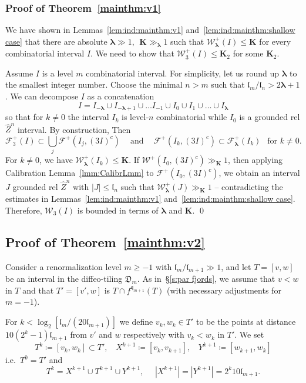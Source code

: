\documentclass{amsart}
\renewcommand{\sp}{{\ \ }}
\newcommand{\1}{{\mathbb 1 }}
\newcommand{\blambda}{{\boldsymbol\lambda}}
\newcommand{\Fam}{{\mathcal F}}
\newcommand{\Width}{{\mathcal W}}
\newcommand{\wZ}{{\widehat Z}}
\newcommand{\bK}{{\mathbf K}}
\newcommand{\qq}{\mathfrak{q}}
\newcommand{\length}{{\mathfrak l}}
\newcommand{\Dbb}{{\mathfrak{D}}}
\theoremstyle{remark}
\numberwithin{equation}{section}
\theoremstyle{definition}
\begin{document}
\subsubsection{Proof of Theorem~\ref{mainthm:v1}} \label{sss:PrfOf mainthm:v1} We have shown in Lemmas~\ref{lem:ind:mainthm:v1} and~\ref{lem:ind:mainthm:shallow case} that there are absolute $\blambda \gg 1,\sp \bK\gg_\blambda 1$ such that $\Width^+_\blambda(I) \le \bK$ for every combinatorial interval $I$. We need to show that $\Width^+_3(I)\le  \bK_2$ for some $\bK_2$.

Assume $I$ is a level $m$ combinatorial interval. For simplicity, let us round up $\blambda$ to the smallest integer number. Choose the minimal $n>m$ such that $\length_{m}/\length_n>2\blambda+1$. We can decompose $I$ as a concatenation \[I=I_{-\blambda}\cup I_{-\blambda+1}\cup \dots I_{-1}\cup I_0\cup I_1\cup \dots \cup I_{\blambda}\]
so that for $k\not=0$ the interval $I_k$ is level-$n$ combinatorial while $I_0$ is a grounded rel $\wZ^{n}$ interval. By construction,
Then \[\Fam^+_{3} (I)\subset \bigcup_{j}\Fam^+(I_j, (3I)^c)\sp\sp\text{ and }\sp\sp \Fam^+(I_k, (3I)^c)\subset \Fam^+_\blambda(I_k)\sp\text{ for }k\not=0.\]
For $k\not=0$, we have $\Width^+_\blambda(I_k)\le \bK$. If $\Width^+(I_0, (3I)^c)\gg _\bK 1$, then applying Calibration Lemma~\ref{lmm:CalibrLmm} to $\Fam^+(I_0, (3I)^c)$, we obtain an interval $J$ grounded rel $\wZ^n$ with $|J|\le \length_n$ such that $\Width^+_\blambda(J)\gg_\bK 1$ -- contradicting the estimates in  Lemmas~\ref{lem:ind:mainthm:v1} and~\ref{lem:ind:mainthm:shallow case}. Therefore, $\Width_3(I)$ is bounded in terms of $\blambda$ and $\bK.$
\qed
 
\subsection{Proof of Theorem~\ref{mainthm:v2}}\label{ss:prf:mainthm:v2} Consider a renormalization level $m\ge -1$ with $\length_{m}/\length_{m+1}\gg 1$, and let $T=[v,w]$ be an interval in the diffeo-tiling $\Dbb_m$. As in~\S\ref{s:par fjords}, we assume that $v<w$ in $T$ and that $T'=[v',w]$ is $T\cap f^{\qq_{m+1}}(T)$ (with necessary adjustments for $m=-1$). 

For $k< \log_2 [\length_{m}/(20\length_{m+1})]$ we define $v_k,w_k\in T'$ to be the points at distance \newline ${10 (2^{k}-1)\length_{m+1}}$ from $v'$ and $w$ respectively with $v_k<w_k$ in $T'$. We set 
\[T^k\coloneqq [v_k,w_k]\subset T',\sp\sp X^{k+1}\coloneqq [v_k,v_{k+1}],\sp\sp Y^{k+1}\coloneqq  [w_{k+1},w_k]\]
i.e.~$T^{0}=T'$ and 
\[T^{k}=X^{k+1}\cup T^{k+1}\cup Y^{k+1},\sp\sp\sp|X^{k+1}|=|Y^{k+1}|=2^{k}10 \length_{m+1}.\]
\end{document}
